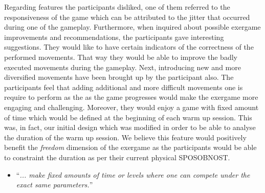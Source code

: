 Regarding features the participants disliked, one of them referred to the responsiveness of the game which can be attributed to the jitter that occurred during one of the gameplay. Furthermore, when inquired about possible exergame improvements and recommendations, the participants  gave interesting suggestions. They would like to have certain indicators of the correctness of the performed movements. That way they would be able to improve the badly executed movements during the gameplay. Next, introducing new and more diversified movements have been brought up by the participant also. The participants feel that adding additional and more difficult movements one is require to perform as the as the game progresses would make the exergame more engaging and challenging. Moreover, they would enjoy a  game with fixed amount of time which would be defined at the beginning of each warm up session. This was, in fact, our initial design which was modified in order to be able to analyse the duration of the warm up session. We believe this feature would positively benefit the \textit{freedom} dimension of the exergame as the participants would be able to constraint the duration as per their current physical SPOSOBNOST.
\begin{itemize}
\item ``\textit{... make fixed amounts of time or levels where one can compete under the exact same parameters.}''
\end{itemize}
